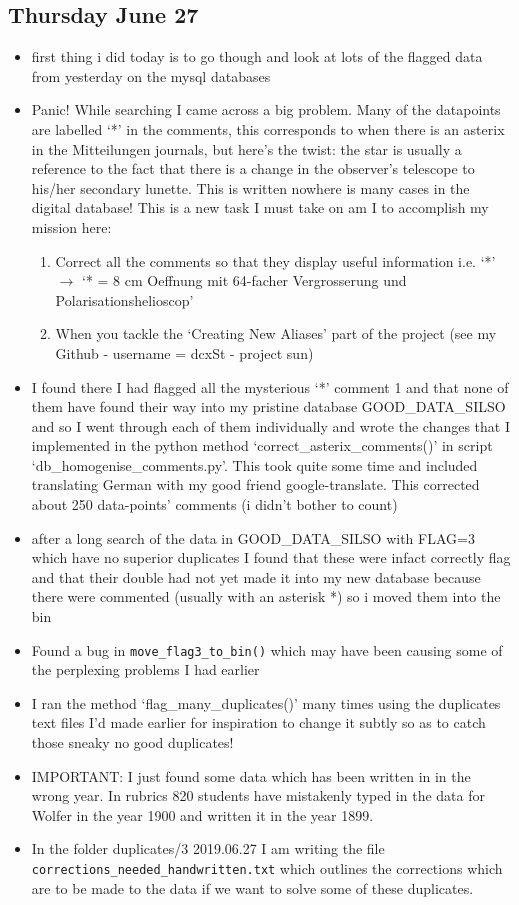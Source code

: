 \documentclass[12pt]{article}
\begin{document}
\subsection{Thursday June 27}
\begin{itemize}
    \item first thing i did today is to go though and look at lots of the flagged data from yesterday on the mysql databases
    \item Panic! While searching I came across a big problem. Many of the datapoints are labelled `*' in the comments, this corresponds to when there is an asterix in the Mitteilungen journals, but here's the twist: the star is usually a reference to the fact that there is a change in the observer's telescope to his/her secondary lunette. This is written nowhere is many cases in the digital database! This is a new task I must take on am I to accomplish my mission here:
    \begin{enumerate}
        \item Correct all the comments so that they display useful information i.e. `*' $\to$ `* = 8 cm Oeffnung mit 64-facher Vergrosserung und Polarisationshelioscop'
        \item When you tackle the `Creating New Aliases' part of the project (see my Github - username = dcxSt - project sun)
    \end{enumerate}
    \item I found there I had flagged all the mysterious `*' comment 1 and that none of them have found their way into my pristine database GOOD\_DATA\_SILSO and so I went through each of them individually and wrote the changes that I implemented in the python method `correct\_asterix\_comments()' in script `db\_homogenise\_comments.py'. This took quite some time and included translating German with my good friend google-translate. This corrected about 250 data-points' comments (i didn't bother to count)
    \item after a long search of the data in GOOD\_DATA\_SILSO with FLAG=3 which have no superior duplicates I found that these were infact correctly flag and that their double had not yet made it into my new database because there were commented (usually with an asterisk *) so i moved them into the bin
    \item Found a bug in \texttt{move\_flag3\_to\_bin()} which may have been causing some of the perplexing problems I had earlier
    \item I ran the method `flag\_many\_duplicates()' many times using the duplicates text files I'd made earlier for inspiration to change it subtly so as to catch those sneaky no good duplicates!
    \item IMPORTANT: I just found some data which has been written in in the wrong year. In rubrics 820 students have mistakenly typed in the data for Wolfer in the year 1900 and written it in the year 1899.
    \item In the folder duplicates/3 2019.06.27 I am writing the file \texttt{corrections\_needed\_handwritten.txt} which outlines the corrections which are to be made to the data if we want to solve some of these duplicates.
\end{itemize}
    
\end{document}

